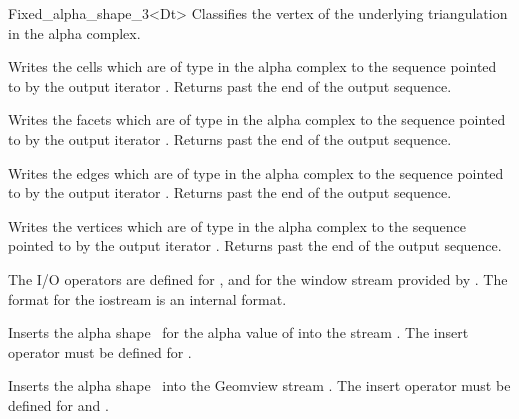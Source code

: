 \begin{ccRefClass} {Fixed_alpha_shape_3<Dt>}
{Classifies the vertex  of the underlying triangulation in the alpha complex.}



{Writes the cells which are of type  in the alpha complex
to the sequence
pointed to by the output iterator . Returns past the end
of the output sequence.}


{Writes the facets which are of type  in the alpha complex
to the sequence pointed to by the output iterator . Returns past the end
of the output sequence.}

{Writes the edges which are of type  in the alpha complex 
to the sequence
pointed to by the output iterator . Returns past the end
of the output sequence.}

{Writes the vertices which are of type  in the alpha complex
to the sequence pointed to by the output iterator . Returns past the end
of the output sequence.}


The I/O operators are defined for , and for
the window stream provided by \cgal. The format for the iostream
is an internal format. 


{Inserts the alpha shape \ccVar\ for the alpha value of  into the stream .
\ccRequire The insert operator must be defined for .}



{Inserts the alpha shape \ccVar\ into the Geomview stream .
\ccRequire The insert operator must be defined for  and .}

\end{ccRefClass}

